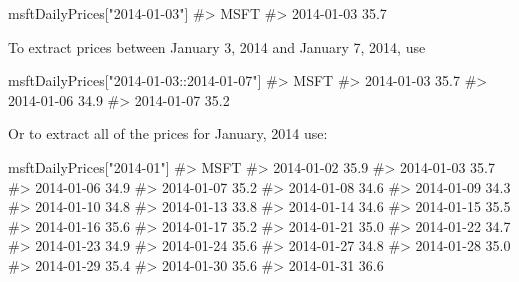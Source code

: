 \documentclass[
  letterpaper,
  DIV=11,
  numbers=noendperiod]{scrreprt}
\newenvironment{Shaded}{\begin{snugshade}}{\end{snugshade}}
\newcommand{\CommentTok}[1]{\textcolor[rgb]{0.37,0.37,0.37}{#1}}
\newcommand{\NormalTok}[1]{\textcolor[rgb]{0.00,0.23,0.31}{#1}}
\newcommand{\StringTok}[1]{\textcolor[rgb]{0.13,0.47,0.30}{#1}}
\theoremstyle{definition}
\theoremstyle{definition}
\theoremstyle{remark}
\begin{document}
\begin{Shaded}
\begin{Highlighting}[]
\NormalTok{msftDailyPrices[}\StringTok{"2014{-}01{-}03"}\NormalTok{]}
\CommentTok{\#\textgreater{}            MSFT}
\CommentTok{\#\textgreater{} 2014{-}01{-}03 35.7}
\end{Highlighting}
\end{Shaded}

To extract prices between January 3, 2014 and January 7, 2014, use

\begin{Shaded}
\begin{Highlighting}[]
\NormalTok{msftDailyPrices[}\StringTok{"2014{-}01{-}03::2014{-}01{-}07"}\NormalTok{]}
\CommentTok{\#\textgreater{}            MSFT}
\CommentTok{\#\textgreater{} 2014{-}01{-}03 35.7}
\CommentTok{\#\textgreater{} 2014{-}01{-}06 34.9}
\CommentTok{\#\textgreater{} 2014{-}01{-}07 35.2}
\end{Highlighting}
\end{Shaded}

Or to extract all of the prices for January, 2014 use:

\begin{Shaded}
\begin{Highlighting}[]
\NormalTok{msftDailyPrices[}\StringTok{"2014{-}01"}\NormalTok{]}
\CommentTok{\#\textgreater{}            MSFT}
\CommentTok{\#\textgreater{} 2014{-}01{-}02 35.9}
\CommentTok{\#\textgreater{} 2014{-}01{-}03 35.7}
\CommentTok{\#\textgreater{} 2014{-}01{-}06 34.9}
\CommentTok{\#\textgreater{} 2014{-}01{-}07 35.2}
\CommentTok{\#\textgreater{} 2014{-}01{-}08 34.6}
\CommentTok{\#\textgreater{} 2014{-}01{-}09 34.3}
\CommentTok{\#\textgreater{} 2014{-}01{-}10 34.8}
\CommentTok{\#\textgreater{} 2014{-}01{-}13 33.8}
\CommentTok{\#\textgreater{} 2014{-}01{-}14 34.6}
\CommentTok{\#\textgreater{} 2014{-}01{-}15 35.5}
\CommentTok{\#\textgreater{} 2014{-}01{-}16 35.6}
\CommentTok{\#\textgreater{} 2014{-}01{-}17 35.2}
\CommentTok{\#\textgreater{} 2014{-}01{-}21 35.0}
\CommentTok{\#\textgreater{} 2014{-}01{-}22 34.7}
\CommentTok{\#\textgreater{} 2014{-}01{-}23 34.9}
\CommentTok{\#\textgreater{} 2014{-}01{-}24 35.6}
\CommentTok{\#\textgreater{} 2014{-}01{-}27 34.8}
\CommentTok{\#\textgreater{} 2014{-}01{-}28 35.0}
\CommentTok{\#\textgreater{} 2014{-}01{-}29 35.4}
\CommentTok{\#\textgreater{} 2014{-}01{-}30 35.6}
\CommentTok{\#\textgreater{} 2014{-}01{-}31 36.6}
\end{Highlighting}
\end{Shaded}
\end{document}
